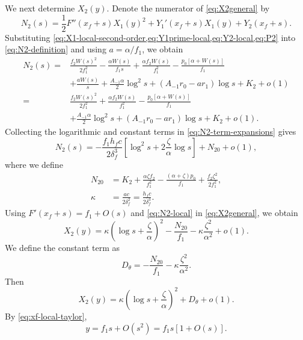 \documentclass[11pt]{article}
\newcommand{\xf}{x_f}
\newcommand{\Dth}{D_\theta}
\begin{document}
We next determine \(X_2(y)\). Denote the numerator of \cref{eq:X2general} by
\begin{equation}
N_2(s)=\frac12F''(\xf+s)X_1(y)^2
+Y_1'(\xf+s)X_1(y)+Y_2(\xf+s).
\label{eq:N2-definition}
\end{equation}
Substituting \cref{eq:X1-local-second-order,eq:Y1prime-local,eq:Y2-local,eq:P2} into \cref{eq:N2-definition} and using \(a=\alpha/f_1\), we obtain
\begin{equation}
\begin{aligned}
N_2(s)={}&\frac{f_2W(s)^2}{2f_1^2}
-\frac{\alpha W(s)}{f_1s}
+\frac{\alpha f_2W(s)}{f_1^2}
-\frac{p_0[\alpha+W(s)]}{f_1}\\
&+\frac{aW(s)}s+\frac{A_{-1}\alpha}{2}\log^2s
+(A_{-1}r_0-ar_1)\log s+K_2+o(1)\\
={}&\frac{f_2W(s)^2}{2f_1^2}
+\frac{\alpha f_2W(s)}{f_1^2}
-\frac{p_0[\alpha+W(s)]}{f_1}\\
&+\frac{A_{-1}\alpha}{2}\log^2s
+(A_{-1}r_0-ar_1)\log s+K_2+o(1).
\end{aligned}
\label{eq:N2-term-expansions}
\end{equation}
Collecting the logarithmic and constant terms in \cref{eq:N2-term-expansions} gives
\begin{equation}
N_2(s)=-\frac{f_1h_fc}{2\delta_f^3}\left[\log^2s+2\frac{\zeta}{\alpha}\log s\right]+N_{20}+o(1),
\label{eq:N2-local}
\end{equation}
where we define
\begin{align}
N_{20}&=K_2+\frac{\alpha\zeta f_2}{f_1^2}
-\frac{(\alpha+\zeta)p_0}{f_1}
+\frac{f_2\zeta^2}{2f_1^2},
\label{eq:N20}\\
\kappa&=\frac{ac}{2\delta_f^2}=\frac{h_fc}{2\delta_f^3}.
\label{eq:kappa}
\end{align}
Using \(F'(\xf+s)=f_1+O(s)\) and \cref{eq:N2-local} in \cref{eq:X2general}, we obtain
\[
X_2(y)=\kappa\left(\log s+\frac{\zeta}{\alpha}\right)^2
-\frac{N_{20}}{f_1}-\kappa\frac{\zeta^2}{\alpha^2}+o(1).
\]
We define the constant term as
\begin{equation}
\Dth=-\frac{N_{20}}{f_1}-\kappa\frac{\zeta^2}{\alpha^2}.
\label{eq:DthetaApp}
\end{equation}
Then
\begin{equation}
X_2(y)=\kappa\left(\log s+\frac{\zeta}{\alpha}\right)^2+\Dth+o(1).
\label{eq:X2-local-Dtheta}
\end{equation}
By \cref{eq:xf-local-taylor},
\begin{equation}
y=f_1s+O(s^2)=f_1s\left[1+O(s)\right].
\label{eq:y-s-local}
\end{equation}
\end{document}
